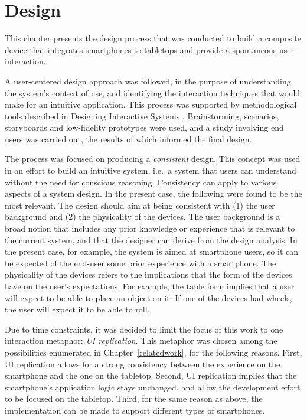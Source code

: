
\chapter{Design}
\label{design}

This chapter presents the design process that was conducted to build a composite device that integrates smartphones to tabletops and provide a spontaneous user interaction.

A user-centered design approach was followed, in the purpose of understanding the system's context of use, and identifying the interaction techniques that would make for an intuitive application.
This process was supported by methodological tools described in Designing Interactive Systems \citep{Benyon:2010}.
Brainstorming, scenarios, storyboards and low-fidelity prototypes were used, and a study involving end users was carried out, the results of which informed the final design.

The process was focused on producing a \emph{consistent} design.
This concept was used in an effort to build an intuitive system, i.e.\ a system that users can understand without the need for conscious reasoning.
Consistency can apply to various aspects of a system design.
In the present case, the following were found to be the most relevant.
The design should aim at being consistent with (1) the user background and (2) the physicality of the devices.
The user background is a broad notion that includes any prior knowledge or experience that is relevant to the current system, and that the designer can derive from the design analysis.
In the present case, for example, the system is aimed at smartphone users, so it can be expected of the end-user some prior experience with a smartphone.
The physicality of the devices refers to the implications that the form of the devices have on the user's expectations.
For example, the table form implies that a user will expect to be able to place an object on it.
If one of the devices had wheels, the user will expect it to be able to roll.

Due to time constraints, it was decided to limit the focus of this work to one interaction metaphor: \emph{UI replication}.
This metaphor was chosen among the possibilities enumerated in Chapter~\ref{relatedwork}, for the following reasons.
First, UI replication allows for a strong consistency between the experience on the smartphone and the one on the tabletop.
Second, UI replication implies that the smartphone's application logic stays unchanged, and allow the development effort to be focused on the tabletop.
Third, for the same reason as above, the implementation can be made to support different types of smartphones.

